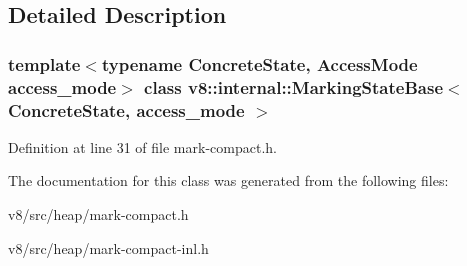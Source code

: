 \subsection{Detailed Description}
\subsubsection*{template$<$typename Concrete\+State, Access\+Mode access\+\_\+mode$>$\newline
class v8\+::internal\+::\+Marking\+State\+Base$<$ Concrete\+State, access\+\_\+mode $>$}



Definition at line 31 of file mark-\/compact.\+h.



The documentation for this class was generated from the following files\+:\begin{DoxyCompactItemize}
\item 
v8/src/heap/mark-\/compact.\+h\item 
v8/src/heap/mark-\/compact-\/inl.\+h\end{DoxyCompactItemize}
